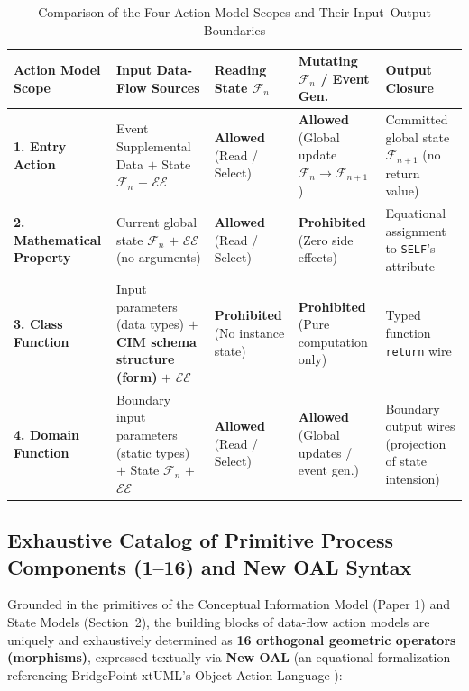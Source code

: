 \documentclass[11pt,a4paper]{article}
\theoremstyle{definition}
\theoremstyle{plain}
\theoremstyle{remark}
\begin{document}
\begin{table}[htbp]
\centering
\caption{Comparison of the Four Action Model Scopes and Their Input--Output Boundaries}
\label{tab:action-scopes}
\small
\begin{tabular}{>{\raggedright\arraybackslash}p{3.0cm} >{\raggedright\arraybackslash}p{3.7cm} >{\raggedright\arraybackslash}p{2.3cm} >{\raggedright\arraybackslash}p{2.8cm} >{\raggedright\arraybackslash}p{3.0cm}}
\toprule
\textbf{Action Model Scope} & \textbf{Input Data-Flow Sources} & \textbf{Reading State $\mathcal{F}_n$} & \textbf{Mutating $\mathcal{F}_n$ / Event Gen.} & \textbf{Output Closure} \\
\midrule
\textbf{1. Entry Action} & Event Supplemental Data $+$ State $\mathcal{F}_n$ $+$ $\mathcal{EE}$ & \textbf{Allowed} (Read / Select) & \textbf{Allowed} (Global update $\mathcal{F}_n \to \mathcal{F}_{n+1}$) & Committed global state $\mathcal{F}_{n+1}$ (no return value) \\
\addlinespace
\textbf{2. Mathematical Property} & Current global state $\mathcal{F}_n$ $+$ $\mathcal{EE}$ (no arguments) & \textbf{Allowed} (Read / Select) & \textbf{Prohibited} (Zero side effects) & Equational assignment to \texttt{SELF}'s attribute \\
\addlinespace
\textbf{3. Class Function} & Input parameters (data types) $+$ \textbf{CIM schema structure (form)} $+$ $\mathcal{EE}$ & \textbf{Prohibited} (No instance state) & \textbf{Prohibited} (Pure computation only) & Typed function \texttt{return} wire \\
\addlinespace
\textbf{4. Domain Function} & Boundary input parameters (static types) $+$ State $\mathcal{F}_n$ $+$ $\mathcal{EE}$ & \textbf{Allowed} (Read / Select) & \textbf{Allowed} (Global updates / event gen.) & Boundary output wires (projection of state intension) \\
\bottomrule
\end{tabular}
\end{table}

\subsection{Exhaustive Catalog of Primitive Process Components (1--16) and New OAL Syntax}
Grounded in the primitives of the Conceptual Information Model (Paper 1) and State Models (Section~2), the building blocks of data-flow action models are uniquely and exhaustively determined as \textbf{16 orthogonal geometric operators (morphisms)}, expressed textually via \textbf{New OAL} (an equational formalization referencing BridgePoint xtUML's Object Action Language \cite{mellor2002,xtumlorg}):
\end{document}

